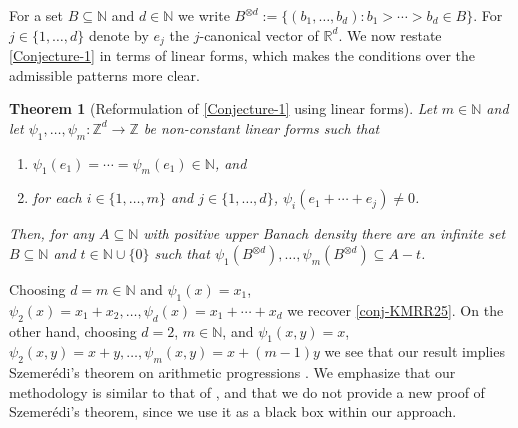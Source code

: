 \documentclass[letter,11pt]{article}
\newtheorem{theo}{Theorem}[section]
\theoremstyle{definition}
\newcommand{\N}{\mathbb{N}}
\newcommand{\Z}{\mathbb{Z}}
\newcommand{\R}{\mathbb{R}}
\begin{document}
For a set $B\subseteq \N$ and $d\in \N$ we write $B^{\otimes d}:= \{(b_1,\ldots,b_d): b_1>\cdots >b_d \in B \}$. For $j\in \{1,\ldots,d\}$ denote by $e_j$ the $j$-canonical vector of $\R^d$. We now restate \cref{Conjecture-1} in terms of linear forms, which makes the conditions over the admissible patterns more clear. 
\begin{theo}[Reformulation of \cref{Conjecture-1} using linear forms]\label{restatement-main-theorem}
    Let $m\in \N$ and let $\psi_1,\ldots,\psi_m:\Z^d\to \Z$ be non-constant linear forms such that 
    \begin{enumerate}
        \item\label{C1} $\psi_1(e_1)=\cdots= \psi_m(e_1) \in \N$, and
        \item\label{C2} for each $i\in\{1,\ldots,m\}$ and $j\in \{1,\ldots, d\}$, $\psi_i(e_1+\cdots+ e_j)\neq 0$.
    \end{enumerate}
    Then, for any $A\subseteq \N$ with positive upper Banach density there are an infinite set $B\subseteq \N$ and $t\in \N\cup\{0\}$ such that $\psi_1(B^{\otimes d}),\ldots, \psi_m(B^{\otimes d})\subseteq A-t$.
\end{theo}

Choosing $d=m\in \N$ and $\psi_1(x)=x_1$, $\psi_2(x)=x_1+x_2,\ldots, \psi_d(x)=x_1+\cdots+x_d$ we recover \cref{conj-KMRR25}. On the other hand, choosing $d=2$, $m\in \N$, and $\psi_1(x,y)=x$, $\psi_2(x,y)=x+y, \ldots, \psi_m(x,y)=x+(m-1)y$ we see that our result implies Szemerédi's theorem on arithmetic progressions \cite{Szemeredi75}. We emphasize that our methodology is similar to that of \cite{kmrr25}, and that we do not provide a new proof of Szemerédi's theorem, since we use it as a black box within our approach.
\end{document}
